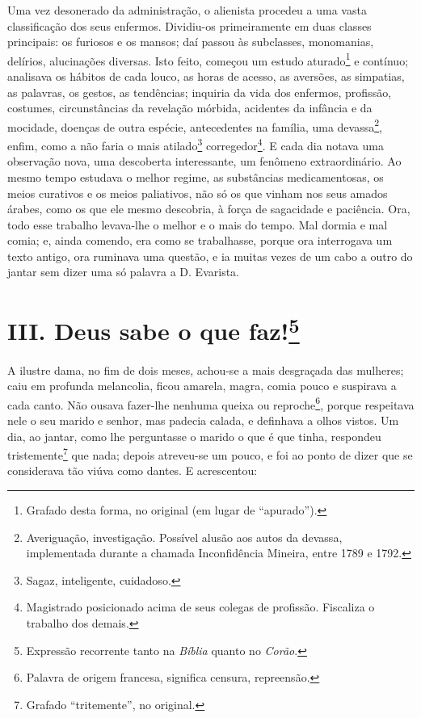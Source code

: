 Uma vez desonerado da administração, o alienista procedeu a uma vasta
classificação dos seus enfermos. Dividiu-os primeiramente em duas
classes principais: os furiosos e os mansos; daí passou às subclasses,
monomanias, delírios, alucinações diversas. Isto feito, começou um
estudo aturado\footnote{Grafado desta forma, no original (em lugar de
  ``apurado'').} e contínuo; analisava os hábitos de cada louco, as
horas de acesso, as aversões, as simpatias, as palavras, os gestos, as
tendências; inquiria da vida dos enfermos, profissão, costumes,
circunstâncias da revelação mórbida, acidentes da infância e da
mocidade, doenças de outra espécie, antecedentes na família, uma
devassa\footnote{Averiguação, investigação. Possível alusão aos autos da
  devassa, implementada durante a chamada Inconfidência Mineira, entre
  1789 e 1792.}, enfim, como a não faria o mais atilado\footnote{Sagaz,
  inteligente, cuidadoso.} corregedor\footnote{Magistrado posicionado
  acima de seus colegas de profissão. Fiscaliza o trabalho dos demais.}.
E cada dia notava uma observação nova, uma descoberta interessante, um
fenômeno extraordinário. Ao mesmo tempo estudava o melhor regime, as
substâncias medicamentosas, os meios curativos e os meios paliativos,
não só os que vinham nos seus amados árabes, como os que ele mesmo
descobria, à força de sagacidade e paciência. Ora, todo esse trabalho
levava-lhe o melhor e o mais do tempo. Mal dormia e mal comia; e, ainda
comendo, era como se trabalhasse, porque ora interrogava um texto
antigo, ora ruminava uma questão, e ia muitas vezes de um cabo a outro
do jantar sem dizer uma só palavra a D. Evarista.

\chapter{III. Deus sabe o que faz!\footnote{Expressão recorrente tanto na
  \emph{Bíblia} quanto no \emph{Corão}.}}

A ilustre dama, no fim de dois meses, achou-se a mais desgraçada das
mulheres; caiu em profunda melancolia, ficou amarela, magra, comia pouco
e suspirava a cada canto. Não ousava fazer-lhe nenhuma queixa ou
reproche\footnote{Palavra de origem francesa, significa censura,
  repreensão.}, porque respeitava nele o seu marido e senhor, mas
padecia calada, e definhava a olhos vistos. Um dia, ao jantar, como lhe
perguntasse o marido o que é que tinha, respondeu tristemente\footnote{Grafado
  ``tritemente'', no original.} que nada; depois atreveu-se um pouco, e
foi ao ponto de dizer que se considerava tão viúva como dantes. E
acrescentou:

